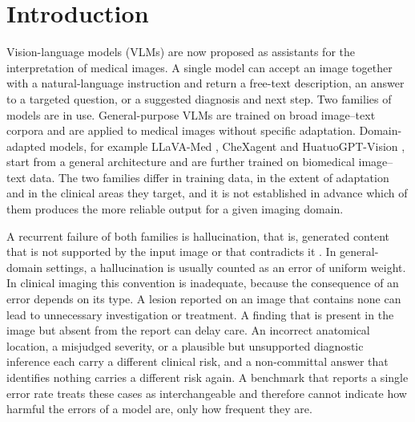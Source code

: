 \documentclass[11pt,a4paper]{article}
\begin{document}
\section{Introduction}
\label{sec:intro}


Vision-language models (VLMs) are now proposed as assistants for the interpretation of medical images. A single model can accept an image together with a natural-language instruction and return a free-text description, an answer to a targeted question, or a suggested diagnosis and next step. Two families of models are in use. General-purpose VLMs are trained on broad image--text corpora and are applied to medical images without specific adaptation. Domain-adapted models, for example LLaVA-Med \citep{li2023llavamed}, CheXagent \citep{chen2024chexagent} and HuatuoGPT-Vision \citep{chen2024huatuogptvision}, start from a general architecture and are further trained on biomedical image--text data. The two families differ in training data, in the extent of adaptation and in the clinical areas they target, and it is not established in advance which of them produces the more reliable output for a given imaging domain.

A recurrent failure of both families is hallucination, that is, generated content that is not supported by the input image or that contradicts it \citep{ji2023survey,bai2024hallucination}. In general-domain settings, a hallucination is usually counted as an error of uniform weight. In clinical imaging this convention is inadequate, because the consequence of an error depends on its type. A lesion reported on an image that contains none can lead to unnecessary investigation or treatment. A finding that is present in the image but absent from the report can delay care. An incorrect anatomical location, a misjudged severity, or a plausible but unsupported diagnostic inference each carry a different clinical risk, and a non-committal answer that identifies nothing carries a different risk again. A benchmark that reports a single error rate treats these cases as interchangeable and therefore cannot indicate how harmful the errors of a model are, only how frequent they are.
\end{document}
